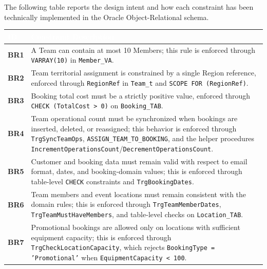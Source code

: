 \documentclass[12pt,a4paper]{article}
\begin{document}
The following table reports the design intent and how each constraint has been technically implemented in the Oracle Object-Relational schema.

\begin{center}
\renewcommand{\arraystretch}{1.5}
\small
\begin{tabular}{|p{}|p{}|}
\hline
\rowcolor[rgb]{0.1, 0.3, 0.5} 
\textcolor{white}{\textbf{ID}} & \textcolor{white}{\textbf{Constraint Description}} \\ \hline

\textbf{BR1} & A Team can contain at most 10 Members; this rule is enforced through \texttt{VARRAY(10)} in \texttt{Member\_VA}. \\ \hline

\textbf{BR2} & Team territorial assignment is constrained by a single Region reference, enforced through \texttt{RegionRef} in \texttt{Team\_t} and \texttt{SCOPE FOR (RegionRef)}. \\ \hline

\textbf{BR3} & Booking total cost must be a strictly positive value, enforced through \texttt{CHECK (TotalCost > 0)} on \texttt{Booking\_TAB}. \\ \hline

\textbf{BR4} & Team operational count must be synchronized when bookings are inserted, deleted, or reassigned; this behavior is enforced through \texttt{TrgSyncTeamOps}, \texttt{ASSIGN\_TEAM\_TO\_BOOKING}, and the helper procedures \texttt{IncrementOperationsCount}/\texttt{DecrementOperationsCount}. \\ \hline

\textbf{BR5} & Customer and booking data must remain valid with respect to email format, dates, and booking-domain values; this is enforced through table-level \texttt{CHECK} constraints and \texttt{TrgBookingDates}. \\ \hline

\textbf{BR6} & Team members and event locations must remain consistent with the domain rules; this is enforced through \texttt{TrgTeamMemberDates}, \texttt{TrgTeamMustHaveMembers}, and table-level checks on \texttt{Location\_TAB}. \\ \hline

\textbf{BR7} & Promotional bookings are allowed only on locations with sufficient equipment capacity; this is enforced through \texttt{TrgCheckLocationCapacity}, which rejects \texttt{BookingType = 'Promotional'} when \texttt{EquipmentCapacity < 100}. \\ \hline

\end{tabular}
\end{center}
\end{document}
